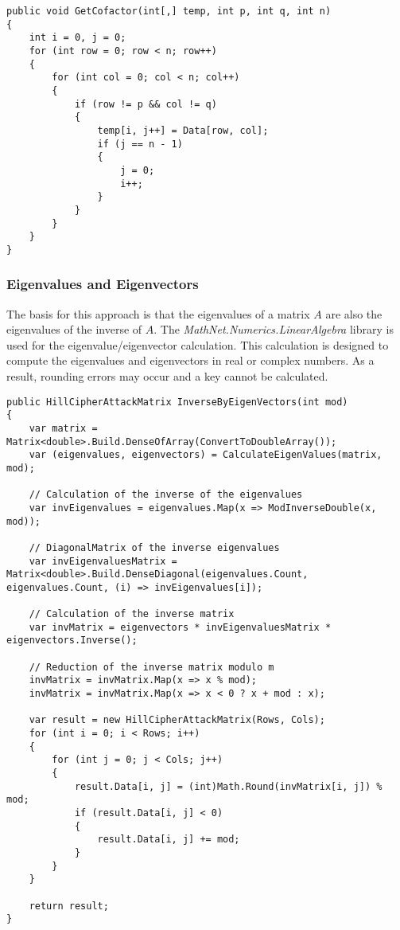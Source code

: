 \documentclass[conference]{IEEEtran}
\begin{document}
\begin{lstlisting}[caption={GetCofactor method}, label={lst:calcCofa}]
public void GetCofactor(int[,] temp, int p, int q, int n)
{
    int i = 0, j = 0;
    for (int row = 0; row < n; row++)
    {
        for (int col = 0; col < n; col++)
        {
            if (row != p && col != q)
            {
                temp[i, j++] = Data[row, col];
                if (j == n - 1)
                {
                    j = 0;
                    i++;
                }
            }
        }
    }
}
\end{lstlisting}

\subsubsection{Eigenvalues and Eigenvectors}
The basis for this approach is that the eigenvalues of a matrix \(A\) are also the eigenvalues of the inverse of \(A\). The \textit{MathNet.Numerics.LinearAlgebra} library is used for the eigenvalue/eigenvector calculation. This calculation is designed to compute the eigenvalues and eigenvectors in real or complex numbers. As a result, rounding errors may occur and a key  cannot be calculated.
\\

\begin{lstlisting}[caption={InverseByEigenVectors method}, label={lst:calcInverseEigenVec}]
public HillCipherAttackMatrix InverseByEigenVectors(int mod)
{
    var matrix = Matrix<double>.Build.DenseOfArray(ConvertToDoubleArray());
    var (eigenvalues, eigenvectors) = CalculateEigenValues(matrix, mod);

    // Calculation of the inverse of the eigenvalues
    var invEigenvalues = eigenvalues.Map(x => ModInverseDouble(x, mod));

    // DiagonalMatrix of the inverse eigenvalues
    var invEigenvaluesMatrix = Matrix<double>.Build.DenseDiagonal(eigenvalues.Count, eigenvalues.Count, (i) => invEigenvalues[i]);

    // Calculation of the inverse matrix
    var invMatrix = eigenvectors * invEigenvaluesMatrix * eigenvectors.Inverse();

    // Reduction of the inverse matrix modulo m
    invMatrix = invMatrix.Map(x => x % mod);
    invMatrix = invMatrix.Map(x => x < 0 ? x + mod : x);

    var result = new HillCipherAttackMatrix(Rows, Cols);
    for (int i = 0; i < Rows; i++)
    {
        for (int j = 0; j < Cols; j++)
        {
            result.Data[i, j] = (int)Math.Round(invMatrix[i, j]) % mod;
            if (result.Data[i, j] < 0)
            {
                result.Data[i, j] += mod;
            }
        }
    }

    return result;
}
\end{lstlisting}
\end{document}
